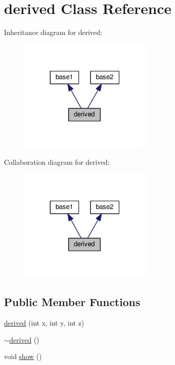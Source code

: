 \hypertarget{classderived}{}\section{derived Class Reference}
\label{classderived}


Inheritance diagram for derived\+:
\nopagebreak
\begin{figure}[H]
\begin{center}
\leavevmode
\includegraphics[width=184pt]{classderived__inherit__graph}
\end{center}
\end{figure}


Collaboration diagram for derived\+:
\nopagebreak
\begin{figure}[H]
\begin{center}
\leavevmode
\includegraphics[width=184pt]{classderived__coll__graph}
\end{center}
\end{figure}
\subsection*{Public Member Functions}
\begin{DoxyCompactItemize}
\item 
\hyperlink{classderived_a187a2a11010dbded8bc498cb65ccb47d}{derived} (int x, int y, int z)
\item 
\hyperlink{classderived_a6d07faec327a1108a1a78f4585689e1c}{$\sim$derived} ()
\item 
void \hyperlink{classderived_aadf177f8b84402f519c92072dab5a89b}{show} ()
\end{DoxyCompactItemize}
